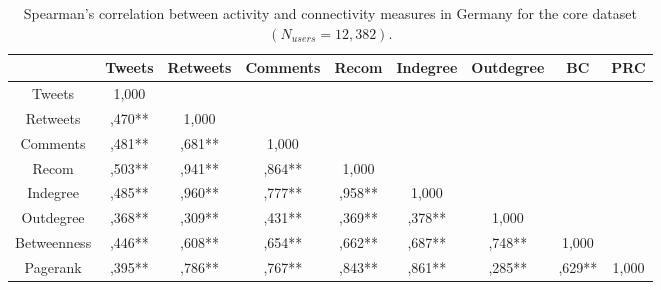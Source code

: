 \begin{table}[ht]%
	\centering
	\caption{Spearman’s correlation between activity and connectivity measures in Germany for the core dataset \((N_{users} = 12,382)\).}%
	\label{tab:spearmanCorrelationGermanyCore}%
	\begin{adjustbox}{width=1\textwidth}
		\small
		\begin{tabular}{ c  c  c  c  c  c  c  c  c }%
			\toprule
			& Tweets & Retweets & Comments & Recom & Indegree & Outdegree & BC & PRC \\
			\hline
			Tweets & 1,000 &  &  &  &  &  &  & \\
			Retweets & ,470** & 1,000 &  &  &  &  &  & \\
			Comments & ,481** & ,681**  & 1,000 &  &  &  &  & \\
			Recom & ,503** & ,941** & ,864**  & 1,000 &  &  &  & \\
			Indegree & ,485** & ,960** & ,777** & ,958** & 1,000 &  &  & \\
			Outdegree & ,368** & ,309** & ,431** & ,369** & ,378** & 1,000 &  & \\
			Betweenness & ,446** & ,608** & ,654** & ,662** & ,687** & ,748** & 1,000 & \\
			Pagerank & ,395** & ,786** &,767** & ,843** & ,861** & ,285** & ,629** & 1,000\\
			\bottomrule
		\end{tabular}%
	\end{adjustbox}
\end{table}

